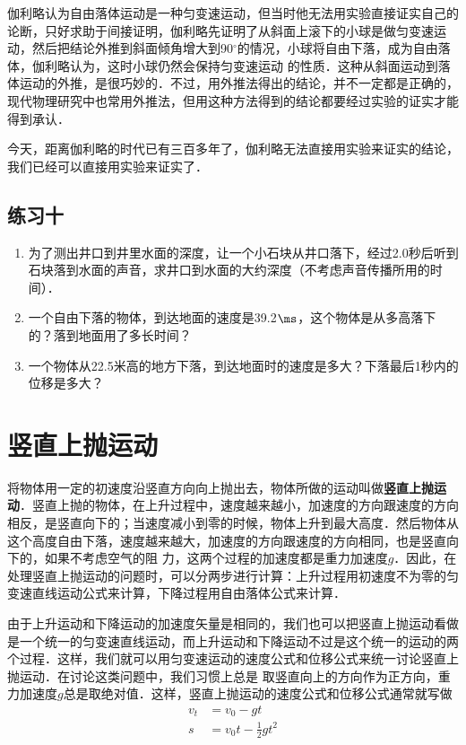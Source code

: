 伽利略认为自由落体运动是一种匀变速运动，但当时他无法用实验直接证实自己的论断，只好求助于间接证明，伽利略先证明了从斜面上滚下的小球是做匀变速运动，然后把结论外推到斜面倾角增大到90$^\circ$的情况，小球将自由下落，成为自由落体，伽利略认为，这时小球仍然会保持匀变速运动
的性质．这种从斜面运动到落体运动的外推，是很巧妙的．不过，用外推法得出的结论，并不一定都是正确的，现代物理研究中也常用外推法，但用这种方法得到的结论都要经过实验的证实才能得到承认．

今天，距离伽利略的时代已有三百多年了，伽利略无法直接用实验来证实的结论，我们已经可以直接用实验来证实了．


\subsection*{练习十}
\begin{enumerate}
	\item 为了测出井口到井里水面的深度，让一个小石块从井口落下，经过2.0秒后听到石块落到水面的声音，求井口到水面的大约深度（不考虑声音传播所用的时间）．
\item 一个自由下落的物体，到达地面的速度是39.2$\ms$，这个物体是从多高落下的？落到地面用了多长时间？
\item 一个物体从22.5米高的地方下落，到达地面时的速度是多大？下落最后1秒内的位移是多大？
\end{enumerate}


\section{竖直上抛运动}
将物体用一定的初速度沿竖直方向向上抛出去，物体所做的运动叫做\textbf{竖直上抛运动}．竖直上抛的物体，在上升过程中，速度越来越小，加速度的方向跟速度的方向相反，是竖直向下的；当速度减小到零的时候，物体上升到最大高度．然后物体从这个高度自由下落，速度越来越大，加速度的方向跟速度的方向相同，也是竖直向下的，如果不考虑空气的阻
力，这两个过程的加速度都是重力加速度$g$．因此，在处理竖直上抛运动的问题时，可以分两步进行计算：上升过程用初速度不为零的匀变速直线运动公式来计算，下降过程用自由落体公式来计算．

由于上升运动和下降运动的加速度矢量是相同的，我们也可以把竖直上抛运动看做是一个统一的匀变速直线运动，而上升运动和下降运动不过是这个统一的运动的两个过程．这样，我们就可以用匀变速运动的速度公式和位移公式来统一讨论竖直上抛运动．在讨论这类问题中，我们习惯上总是
取竖直向上的方向作为正方向，重力加速度$g$总是取绝对值．这样，竖直上抛运动的速度公式和位移公式通常就写做
\[\begin{split}
v_t&=v_0-gt\\
s&=v_0 t-\frac{1}{2}gt^2
\end{split}\]

